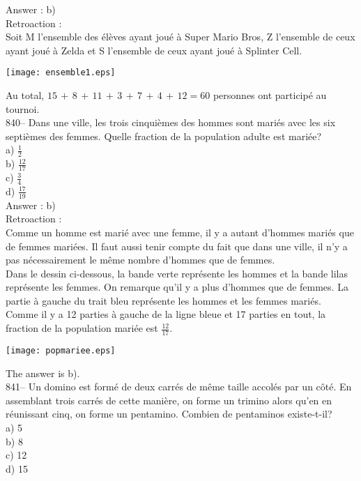 ﻿\documentclass[letterpaper, 12pt]{article}
\begin{document}
Answer : b)\\

Retroaction : \\
Soit M l'ensemble des \'el\`eves ayant jou\'e \`a Super Mario Bros,
Z l'ensemble de ceux ayant jou\'e \`a Zelda et S l'ensemble de ceux ayant
jou\'e \`a Splinter Cell.\\
    \begin{center}
    \texttt{[image: ensemble1.eps]}
    \end{center}
Au total, $15\,+\,8\,+\,11\,+\,3\,+\,7\,+\,4\,+\,12=60$ personnes ont
particip\'e au tournoi.\\

840-- Dans une ville, les trois cinqui\`emes des hommes sont mari\'es avec
les six septi\`emes des femmes.  Quelle fraction de la population adulte est
mari\'ee?\\
a) $\frac{1}{2}$\\ [2mm]
b) $\frac{12}{17}$\\[2mm]
c) $\frac{3}{4}$\\ [2mm]
d) $\frac{17}{19}$\\

Answer : b)\\

Retroaction : \\
Comme un homme est mari\'e avec une femme, il y a autant d'hommes mari\'es
que de femmes mari\'ees.  Il faut aussi tenir compte du fait que dans une
ville, il n'y a pas n\'ecessairement le m\^eme nombre d'hommes que de
femmes.\\
Dans le dessin ci-dessous, la bande verte repr\'esente les hommes et la
bande lilas repr\'esente les femmes.  On remarque qu'il y a plus d'hommes
que de femmes.  La partie \`a gauche du trait bleu repr\'esente les hommes
et les femmes mari\'es.  Comme il y a 12 parties \`a gauche de la ligne
bleue et 17 parties en tout, la fraction de la population mari\'ee est
$\frac{12}{17}$.
    \begin{center}
    \texttt{[image: popmariee.eps]}
    \end{center}

The answer is b).\\

841-- Un domino est form\'e de deux carr\'es de m\^eme taille accol\'es par
un c\^ot\'e.  En assemblant trois carr\'es de cette mani\`ere, on forme un
trimino alors qu'en en r\'eunissant cinq, on forme un pentamino.  Combien de
pentaminos existe-t-il?\\
a) 5\\
b) 8\\
c) 12\\
d) 15\\
\end{document}

